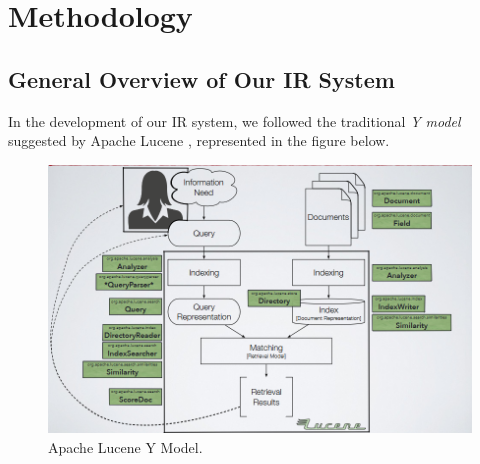\section{Methodology}
\label{sec:methodology}

\subsection{General Overview of Our IR System}
In the development of our \ac{IR} system, we followed the traditional \textit{Y model} suggested by Apache Lucene \cite{lucene}, represented in the figure below.

\begin{figure}[!h]
    \centering
    \includegraphics[width=0.8\linewidth]{figure/lucene_yModel.png}
    \caption{Apache Lucene Y Model.}
    \label{fig:lucene_yModel}
\end{figure}

